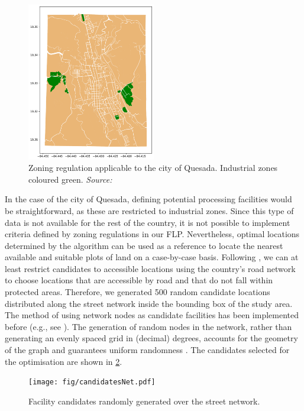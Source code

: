 \begin{figure}[!ht]
\caption[Zoning regulation applicable to the city of Quesada]{Zoning regulation applicable to the city of Quesada. Industrial zones coloured green. \textit{Source: \citep{sancarlosPlan}}}  
\label{sanCarlosPlan}
\centering
\includegraphics[width = 0.5\textwidth]{fig/sanCarlosPlan.pdf}
\end{figure}

In the case of the city of Quesada, defining potential processing facilities would be straightforward, as these are restricted to industrial zones. Since this type of data is not available for the rest of the country, it is not possible to implement criteria defined by zoning regulations in our FLP. Nevertheless, optimal locations determined by the algorithm can be used as a reference to locate the nearest available and suitable plots of land on a case-by-case basis. Following \citeauthor{delivand2015optimal}, we can at least restrict candidates to accessible locations using the country's road network to choose locations that are accessible by road and that do not fall within protected areas. Therefore, we generated 500 random candidate locations distributed along the street network inside the bounding box of the study area. The method of using network nodes as candidate facilities has been implemented before (e.g., see \cite{zhao2015does}). The generation of random nodes in the network, rather than generating an evenly spaced grid in (decimal) degrees, accounts for the geometry of the graph and guarantees uniform randomness \cite{boeing2017osmnx}. The candidates selected for the optimisation are shown in \cref{candidatesNet}. 

\begin{figure}[H]
\caption{Facility candidates randomly generated over the street network.}  
\label{candidatesNet}
\centering
\texttt{[image: fig/candidatesNet.pdf]}
\end{figure}


